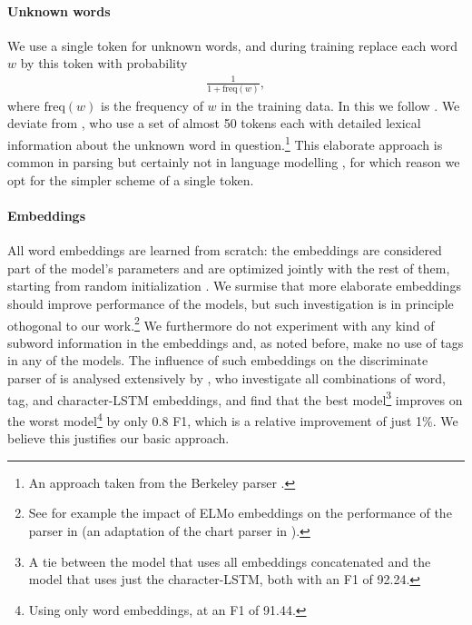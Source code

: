     \paragraph{Unknown words} We use a single token for unknown words, and during training replace each word $w$ by this token with probability
    \begin{align*}
      \frac{1}{1 + \text{freq}(w)},
    \end{align*}
    where $\text{freq}(w)$ is the frequency of $w$ in the training data. In this we follow \citet{stern2017minimal}. We deviate from \citet{dyer2016rnng}, who use a set of almost 50 tokens each with detailed lexical information about the unknown word in question.\footnote{An approach taken from the Berkeley parser \citep{petrov2006learning}.} This elaborate approach is common in parsing but certainly not in language modelling \citep{dyer2016rnng}, for which reason we opt for the simpler scheme of a single token.

    \paragraph{Embeddings}
    \label{sec:impl-embedding}
    All word embeddings are learned from scratch: the embeddings are considered part of the model's parameters and are optimized jointly with the rest of them, starting from random initialization \citep{glorot2010understanding}. We surmise that more elaborate embeddings should improve performance of the models, but such investigation is in principle othogonal to our work.\footnote{See for example the impact of ELMo embeddings \citep{peters2018elmo} on the performance of the parser in \citet{kitaev2018attentive} (an adaptation of the chart parser in \citet{stern2017minimal}).} We furthermore do not experiment with any kind of subword information in the embeddings and, as noted before, make no use of tags in any of the models. The influence of such embeddings on the discriminate parser of \citet{stern2017minimal} is analysed extensively by \citet{stern2018analyis}, who investigate all combinations of word, tag, and character-LSTM embeddings, and find that the best model\footnote{A tie between the model that uses all embeddings concatenated and the model that uses just the character-LSTM, both with an F1 of 92.24.} improves on the worst model\footnote{Using only word embeddings, at an F1 of 91.44.} by only 0.8 F1, which is a relative improvement of just 1\%. We believe this justifies our basic approach.


